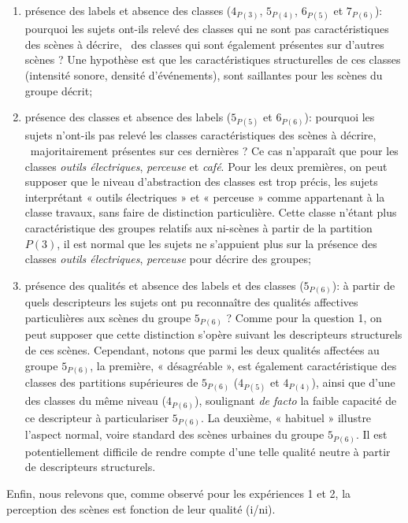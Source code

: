 \begin{enumerate} 
\item présence des labels et absence des classes ($4_{P(3)}$, $5_{P(4)}$, $6_{P(5)}$ et $7_{P(6)}$): pourquoi les sujets ont-ils relevé des classes qui ne sont pas caractéristiques des scènes à décrire, \ie~des classes qui sont également présentes sur d'autres scènes ? Une hypothèse est que les caractéristiques structurelles de ces classes (intensité sonore, densité d'événements), sont saillantes pour les scènes du groupe décrit;
\item présence des classes et absence des labels ($5_{P(5)}$ et $6_{P(6)}$): pourquoi les sujets n'ont-ils pas relevé les classes caractéristiques des scènes à décrire, \ie~majoritairement présentes sur ces dernières ? Ce cas n’apparaît que pour les classes \emph{outils électriques}, \emph{perceuse} et  \emph{café}. Pour les deux premières, on peut supposer que le niveau d'abstraction des classes est trop précis, les sujets interprétant « outils électriques » et « perceuse » comme appartenant à la classe travaux, sans faire de distinction particulière. Cette classe n'étant plus caractéristique des groupes relatifs aux ni-scènes à partir de la partition $P(3)$, il est normal que les sujets ne s'appuient plus sur la présence des classes \emph{outils électriques}, \emph{perceuse} pour décrire des groupes;
\item présence des qualités et absence des labels et des classes ($5_{P(6)}$): à partir de quels descripteurs les sujets ont pu reconnaître des qualités affectives particulières aux scènes du groupe $5_{P(6)}$ ? Comme pour la question 1, on peut supposer que cette distinction s'opère suivant les descripteurs structurels de ces scènes. Cependant, notons que parmi les deux qualités affectées au groupe $5_{P(6)}$, la première, « désagréable », est également caractéristique des classes des partitions supérieures de $5_{P(6)}$ ($4_{P(5)}$ et $4_{P(4)}$), ainsi que d'une des classes du même niveau ($4_{P(6)}$), soulignant \emph{de facto} la faible capacité de ce descripteur à particulariser $5_{P(6)}$. La deuxième, « habituel » illustre l'aspect normal, voire standard des scènes urbaines du groupe $5_{P(6)}$. Il est potentiellement difficile de rendre compte d'une telle qualité neutre à partir de descripteurs structurels.
\end{enumerate}

Enfin, nous relevons que, comme observé pour les expériences 1 et 2, la perception des scènes est fonction de leur qualité (i/ni).


